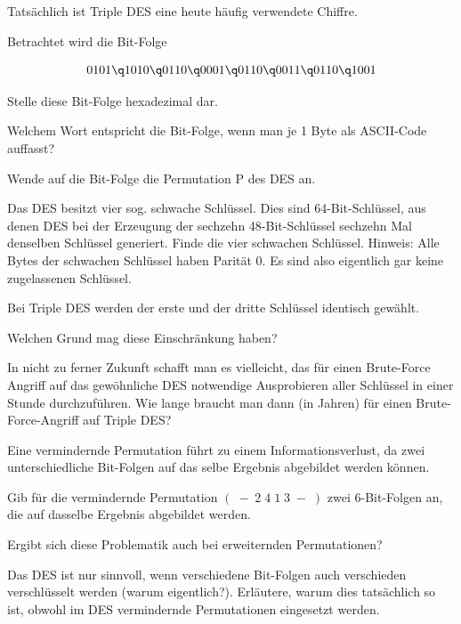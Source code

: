 \documentclass[%
11pt,%
twoside,%
titlepage,%
german,%
headsepline%
]{scrartcl}
\begin{document}
Tatsächlich ist Triple DES eine heute häufig verwendete Chiffre.

\begin{ueb}
Betrachtet wird die Bit-Folge

$$0101\q 1010\q 0110\q 0001\q 0110\q 0011\q 0110\q 1001$$

\begin{enumeratea}
\item Stelle diese Bit-Folge hexadezimal dar. 
\item Welchem Wort entspricht die Bit-Folge, wenn man je 1 Byte als ASCII-Code auffasst? 
\item Wende auf die Bit-Folge die  Permutation P des DES an.
\end{enumeratea}
\end{ueb}

\begin{ueb}
Das DES besitzt vier sog. \glqq schwache Schlüssel\grqq. Dies sind 64-Bit-Schlüssel, aus denen DES bei der Erzeugung der sechzehn 48-Bit-Schlüssel sechzehn Mal denselben Schlüssel generiert. 
Finde die vier schwachen Schlüssel. 
Hinweis: Alle Bytes der schwachen Schlüssel haben Parität 0. Es sind also eigentlich gar keine zugelassenen Schlüssel.
\end{ueb}

\begin{ueb}
Bei Triple DES werden der erste und der dritte Schlüssel identisch gewählt.
\begin{enumeratea} 
\item Welchen Grund mag diese Einschränkung haben? 
\item In nicht zu ferner Zukunft schafft man es vielleicht, das für einen Brute-Force Angriff auf das gewöhnliche DES notwendige Ausprobieren aller  Schlüssel in einer Stunde durchzuführen. 
Wie lange braucht man dann (in Jahren) für einen Brute-Force-Angriff auf Triple DES?
\end{enumeratea}
\end{ueb}

\begin{ueb}
Eine vermindernde Permutation führt zu einem Informationsverlust, da zwei unterschiedliche Bit-Folgen auf das selbe Ergebnis abgebildet werden k\"onnen.
\begin{enumeratea}
\item Gib für die vermindernde Permutation $(\;-\; 2\; 4\; 1\; 3\; -\;)$ zwei 6-Bit-Folgen an, die auf dasselbe Ergebnis abgebildet werden. 
\item Ergibt sich diese Problematik auch bei erweiternden Permutationen? 
\item Das DES ist nur sinnvoll, wenn verschiedene Bit-Folgen auch verschieden verschlüsselt werden (warum eigentlich?). 
Erläutere, warum dies tatsächlich so ist, obwohl im DES vermindernde Permutationen eingesetzt werden.
\end{enumeratea}
\end{ueb}
\end{document}
